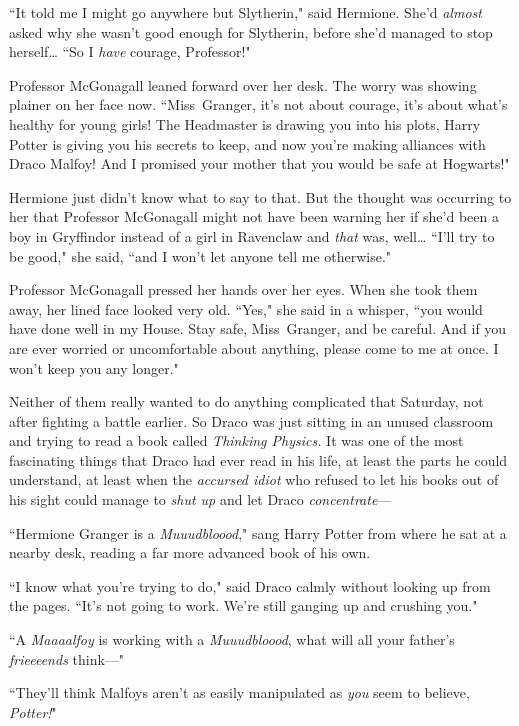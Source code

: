 ``It told me I might go anywhere but Slytherin," said Hermione. She'd \emph{almost} asked why she wasn't good enough for Slytherin, before she'd managed to stop herself{\ldots} ``So I \emph{have} courage, Professor!"

Professor McGonagall leaned forward over her desk. The worry was showing plainer on her face now. ``Miss~Granger, it's not about courage, it's about what's healthy for young girls! The Headmaster is drawing you into his plots, Harry Potter is giving you his secrets to keep, and now you're making alliances with Draco Malfoy! And I promised your mother that you would be safe at Hogwarts!"

Hermione just didn't know what to say to that. But the thought was occurring to her that Professor McGonagall might not have been warning her if she'd been a boy in Gryffindor instead of a girl in Ravenclaw and \emph{that} was, well{\ldots} ``I'll try to be good," she said, ``and I won't let anyone tell me otherwise."

Professor McGonagall pressed her hands over her eyes. When she took them away, her lined face looked very old. ``Yes," she said in a whisper, ``you would have done well in my House. Stay safe, Miss~Granger, and be careful. And if you are ever worried or uncomfortable about anything, please come to me at once. I won't keep you any longer."


Neither of them really wanted to do anything complicated that Saturday, not after fighting a battle earlier. So Draco was just sitting in an unused classroom and trying to read a book called \emph{Thinking Physics.} It was one of the most fascinating things that Draco had ever read in his life, at least the parts he could understand, at least when the \emph{accursed idiot} who refused to let his books out of his sight could manage to \emph{shut up} and let Draco \emph{concentrate}—

``Hermione Granger is a \emph{Muuudbloood}," sang Harry Potter from where he sat at a nearby desk, reading a far more advanced book of his own.

``I know what you're trying to do," said Draco calmly without looking up from the pages. ``It's not going to work. We're still ganging up and crushing you."

``A \emph{Maaaalfoy} is working with a \emph{Muuudbloood}, what will all your father's \emph{frieeeends} think—"

``They'll think Malfoys aren't as easily manipulated as \emph{you} seem to believe, \emph{Potter!}"

